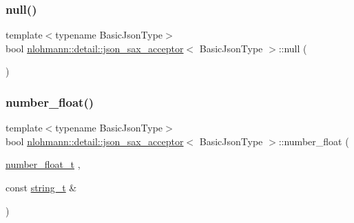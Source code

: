 \subsubsection{\texorpdfstring{null()}{null()}}
{\footnotesize\ttfamily template$<$typename Basic\+Json\+Type$>$ \\
bool \mbox{\hyperlink{classnlohmann_1_1detail_1_1json__sax__acceptor}{nlohmann\+::detail\+::json\+\_\+sax\+\_\+acceptor}}$<$ Basic\+Json\+Type $>$\+::null (\begin{DoxyParamCaption}{ }\end{DoxyParamCaption})\hspace{0.3cm}{\ttfamily [inline]}}

\mbox{\label{classnlohmann_1_1detail_1_1json__sax__acceptor_aebf8800023eb20d472f111f86b189e60}} 
\subsubsection{\texorpdfstring{number\_float()}{number\_float()}}
{\footnotesize\ttfamily template$<$typename Basic\+Json\+Type$>$ \\
bool \mbox{\hyperlink{classnlohmann_1_1detail_1_1json__sax__acceptor}{nlohmann\+::detail\+::json\+\_\+sax\+\_\+acceptor}}$<$ Basic\+Json\+Type $>$\+::number\+\_\+float (\begin{DoxyParamCaption}\item[{\mbox{\hyperlink{classnlohmann_1_1detail_1_1json__sax__acceptor_a5502f483fc60a1bcd73e0e46b6ab36e4}{number\+\_\+float\+\_\+t}}}]{,  }\item[{const \mbox{\hyperlink{classnlohmann_1_1detail_1_1json__sax__acceptor_a3a8078bbf865ec355106f6048241609a}{string\+\_\+t}} \&}]{ }\end{DoxyParamCaption})\hspace{0.3cm}{\ttfamily [inline]}}

\mbox{\label{classnlohmann_1_1detail_1_1json__sax__acceptor_a976bf4ce6e9a2ffe48f683ddff80af00}} 
